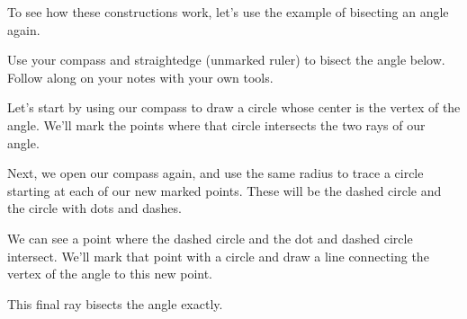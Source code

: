 \documentclass{ximera}
\begin{document}
To see how these constructions work, let's use the example of bisecting an angle again.
\begin{example}
Use your compass and straightedge (unmarked ruler) to bisect the angle below. Follow along on your notes with your own tools.
\begin{image}
\end{image}
Let's start by using our compass to draw a circle whose center is the vertex of the angle. We'll mark the points where that circle intersects the two rays of our angle.
\begin{image}
\end{image}
Next, we open our compass again, and use the same radius to trace a circle starting at each of our new marked points. These will be the dashed circle and the circle with dots and dashes.
\begin{image}
\end{image}
We can see a point where the dashed circle and the dot and dashed circle intersect. We'll mark that point with a circle and draw a line connecting the vertex of the angle to this new point.
\begin{image}
\end{image}
This final ray bisects the angle exactly.
\end{example}
\end{document}
